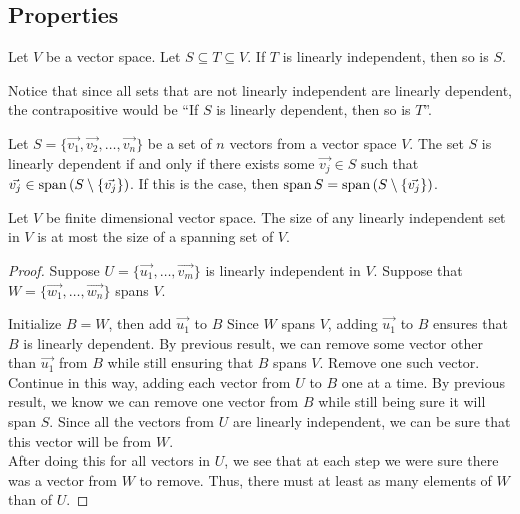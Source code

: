 \subsection{Properties}
\begin{theorem}
	Let $V$ be a vector space.
	Let $S \subseteq T \subseteq V$.
	If $T$ is linearly independent, then so is $S$.
\end{theorem}
Notice that since all sets that are not linearly independent are linearly dependent, the contrapositive would be ``If $S$ is linearly dependent, then so is $T$''.

\begin{theorem}
	Let $S = \{\vec{v_1}, \vec{v_2}, \dots, \vec{v_n}\}$ be a set of $n$ vectors from a vector space $V$. 
	The set $S$ is linearly dependent if and only if there exists some $\vec{v_j} \in S$ such that $\vec{v_j} \in \operatorname{span}{(S \setminus \{\vec{v_j}\})}$.
	If this is the case, then $\operatorname{span}{S} = \operatorname{span}{(S \setminus \{\vec{v_j}\})}$.
\end{theorem}

\begin{theorem}
	Let $V$ be finite dimensional vector space.
	The size of any linearly independent set in $V$ is at most the size of a spanning set of $V$.
\end{theorem}
\begin{proof}
	Suppose $U = \{\vec{u_1}, \dots, \vec{v_m}\}$ is linearly independent in $V$.
	Suppose that $W = \{\vec{w_1}, \dots, \vec{w_n}\}$ spans $V$.
	
	Initialize $B = W$, then add $\vec{u_1}$ to $B$
	Since $W$ spans $V$, adding $\vec{u_1}$ to $B$ ensures that $B$ is linearly dependent.
	By previous result, we can remove some vector other than $\vec{u_1}$ from $B$ while still ensuring that $B$ spans $V$.
	Remove one such vector. \\
	
	Continue in this way, adding each vector from $U$ to $B$ one at a time.
	By previous result, we know we can remove one vector from $B$ while still being sure it will span $S$.
	Since all the vectors from $U$ are linearly independent, we can be sure that this vector will be from $W$. \\
	
	After doing this for all vectors in $U$, we see that at each step we were sure there was a vector from $W$ to remove.
	Thus, there must at least as many elements of $W$ than of $U$.
\end{proof}


